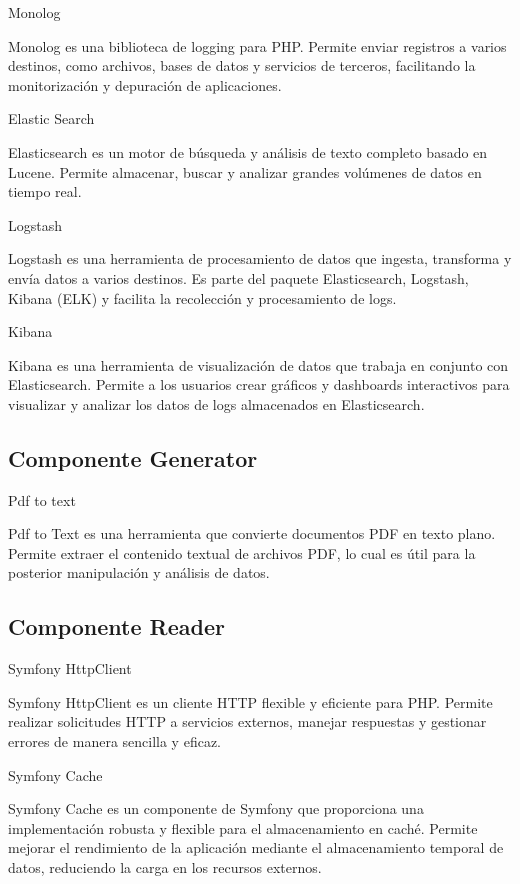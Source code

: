Monolog

Monolog es una biblioteca de logging para PHP. Permite enviar registros a varios destinos, como archivos, bases de datos
y servicios de terceros, facilitando la monitorización y depuración de aplicaciones.

Elastic Search

Elasticsearch es un motor de búsqueda y análisis de texto completo basado en Lucene.
Permite almacenar, buscar y analizar grandes volúmenes de datos en tiempo real.

Logstash

Logstash es una herramienta de procesamiento de datos que ingesta, transforma y envía datos a varios
destinos.
Es parte del paquete Elasticsearch, Logstash, Kibana (ELK) y facilita la recolección y procesamiento de logs.

Kibana

Kibana es una herramienta de visualización de datos que trabaja en conjunto con Elasticsearch.
Permite a los usuarios crear gráficos y dashboards interactivos para visualizar y analizar los datos de logs almacenados
en Elasticsearch.

\subsection*{Componente Generator}

Pdf to text

Pdf to Text es una herramienta que convierte documentos PDF en texto plano.
Permite extraer el contenido textual de archivos PDF, lo cual es útil para la posterior manipulación y análisis de
datos.

\subsection*{Componente Reader}

Symfony HttpClient

Symfony HttpClient es un cliente HTTP flexible y eficiente para PHP. Permite realizar solicitudes HTTP a servicios
externos, manejar respuestas y gestionar errores de manera sencilla y eficaz.

Symfony Cache

Symfony Cache es un componente de Symfony que proporciona una implementación robusta y flexible para el almacenamiento
en caché.
Permite mejorar el rendimiento de la aplicación mediante el almacenamiento temporal de datos, reduciendo la carga en los
recursos externos.


